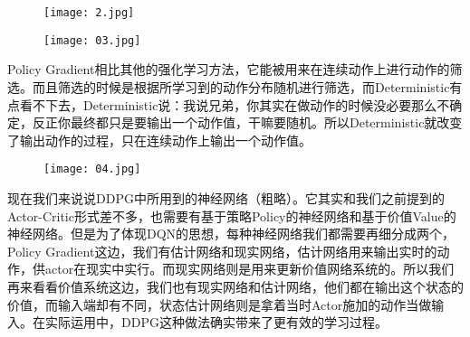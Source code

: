 \documentclass[12pt]{article}
\begin{document}
\begin{figure}[htbp]
	\centering
	\texttt{[image: 2.jpg]}
\end{figure}

\begin{figure}[htbp]
	\centering
	\texttt{[image: 03.jpg]}
\end{figure}

Policy Gradient相比其他的强化学习方法，它能被用来在连续动作上进行动作的筛选。而且筛选的时候是根据所学习到的动作分布随机进行筛选，而Deterministic有点看不下去，Deterministic说：我说兄弟，你其实在做动作的时候没必要那么不确定，反正你最终都只是要输出一个动作值，干嘛要随机。所以Deterministic就改变了输出动作的过程，只在连续动作上输出一个动作值。
\begin{figure}[htbp]
	\centering
	\texttt{[image: 04.jpg]}
\end{figure}

现在我们来说说DDPG中所用到的神经网络（粗略）。它其实和我们之前提到的Actor-Critic形式差不多，也需要有基于策略Policy的神经网络和基于价值Value的神经网络。但是为了体现DQN的思想，每种神经网络我们都需要再细分成两个，Policy Gradient这边，我们有估计网络和现实网络，估计网络用来输出实时的动作，供actor在现实中实行。而现实网络则是用来更新价值网络系统的。所以我们再来看看价值系统这边，我们也有现实网络和估计网络，他们都在输出这个状态的价值，而输入端却有不同，状态估计网络则是拿着当时Actor施加的动作当做输入。在实际运用中，DDPG这种做法确实带来了更有效的学习过程。
\end{document}
